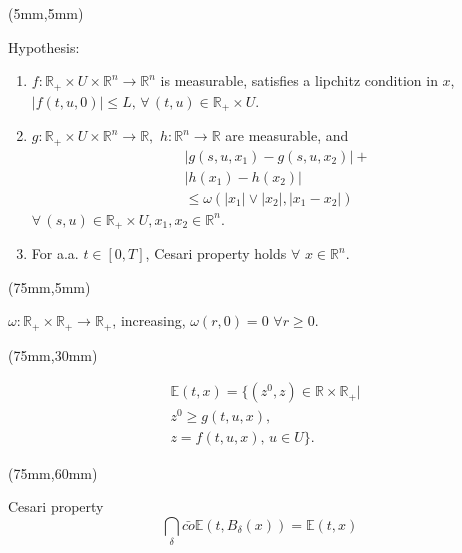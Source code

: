 \begin{frame}[plain]
	\begin{textblock*}{60mm}(5mm,5mm)
		\begin{graybox}{Hypothesis:}
			\begin{enumerate}[(\textbf{{C}}-1)]
				\item<1->
					$
						f:\mathbb{R}_{+}\times U
						\times \mathbb{R}^n\rightarrow 
						\mathbb{R}^n
					$ is measurable, satisfies a lipchitz
					 condition in $x$,
					$
						|f(t,u,0)|\leq L,\,
						 \forall\,(t,u)\in
						 \mathbb{R}_{+}\times U .
					$
				\item<2->
					$
						g:\mathbb{R}_{+}\times U\times 
						\mathbb{R}^n\rightarrow \mathbb{R},
					$ 
					$
						h:\mathbb{R}^n\rightarrow \mathbb{R}
					$ are measurable, and
					\begin{align*}
						&|g(s,u,x_1)-g(s,u,x_2)|+\\
						&|h(x_1)-h(x_2)|\\
						&\leq \omega(|x_1|\vee |x_2|,|x_1-x_2|)
					\end{align*}
					$
						\forall\, (s,u)\in \mathbb{R}_{+}
						\times U,x_1,x_2\in \mathbb{R}^n
					$.
				\item<3->
					For a.a. $t\in[0,T]$, Cesari property holds $\forall$ $x\in \mathbb{R}^n$.
			\end{enumerate}	
		\end{graybox}
	\end{textblock*}
	{
		\begin{textblock*}{50mm}(75mm,5mm)
			\begin{yellowbox}{}
				$\omega:\mathbb{R}_{+}\times\mathbb{R}_{+}\rightarrow \mathbb{R}_{+}$, increasing, $\omega(r,0)=0$ $\forall r\geq 0$.
			\end{yellowbox}
		\end{textblock*}
	}
	{
		\begin{textblock*}{50mm}(75mm,30mm)
			\begin{yellowbox}{}
				\begin{align*}
					&\mathbb{E}(t,x)=\{(z^0,z)\in \mathbb{R}\times \mathbb{R}_{+}|\\
					&z^0\geq g(t,u,x),\\
					&z=f(t,u,x),\, u\in U\}.
				\end{align*}			
			\end{yellowbox}
		\end{textblock*}
	
		\begin{textblock*}{50mm}(75mm,60mm)
			\begin{yellowbox}{Cesari property}
				\begin{equation*}
				\bigcap_{\delta}\bar{co}\mathbb{E}(t,B_{\delta}(x))=\mathbb{E}(t,x)
				\end{equation*}			
			\end{yellowbox}
		\end{textblock*}
	}
\end{frame}

